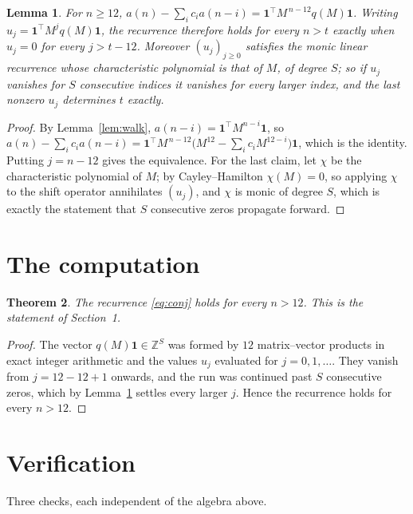 \documentclass[11pt,a4paper]{article}
\theoremstyle{plain}
\newtheorem{theorem}{Theorem}
\newtheorem{lemma}[theorem]{Lemma}
\theoremstyle{definition}
\begin{document}
\begin{lemma}\label{lem:crit}
For $n\ge12$,
$a(n)-\sum_i c_i a(n-i)=\mathbf{1}^{\!\top}M^{\,n-12}q(M)\mathbf{1}$. Writing
$u_j=\mathbf{1}^{\!\top}M^{j}q(M)\mathbf{1}$, the recurrence therefore holds for every
$n>t$ exactly when $u_j=0$ for every $j>t-12$. Moreover $(u_j)_{j\ge0}$ satisfies the
monic linear recurrence whose characteristic polynomial is that of $M$, of degree $S$; so
if $u_j$ vanishes for $S$ consecutive indices it vanishes for every larger index, and the
last nonzero $u_j$ determines $t$ exactly.
\end{lemma}

\begin{proof}
By Lemma~\ref{lem:walk}, $a(n-i)=\mathbf{1}^{\!\top}M^{n-i}\mathbf{1}$, so
$a(n)-\sum_i c_i a(n-i)
=\mathbf{1}^{\!\top}M^{\,n-12}\bigl(M^{12}-\sum_i c_i M^{12-i}\bigr)
\mathbf{1}$, which is the identity. Putting $j=n-12$ gives the equivalence. For the
last claim, let $\chi$ be the characteristic polynomial of $M$; by Cayley--Hamilton
$\chi(M)=0$, so applying $\chi$ to the shift operator annihilates $(u_j)$, and $\chi$ is
monic of degree $S$, which is exactly the statement that $S$ consecutive zeros propagate
forward.
\end{proof}

\section{The computation}

\begin{theorem}
The recurrence \eqref{eq:conj} holds for every $n>12$. This is the statement of
Section~1.
\end{theorem}

\begin{proof}
The vector $q(M)\mathbf{1}\in\mathbb{Z}^{S}$ was formed by $12$ matrix--vector
products in exact integer arithmetic and the values $u_j$ evaluated for
$j=0,1,\dots$. They vanish from $j=12-12+1$ onwards, and the run was continued past
$S$ consecutive zeros, which by Lemma~\ref{lem:crit} settles every larger $j$. Hence the
recurrence holds for every $n>12$.
\end{proof}

\section{Verification}

Three checks, each independent of the algebra above.
\end{document}
